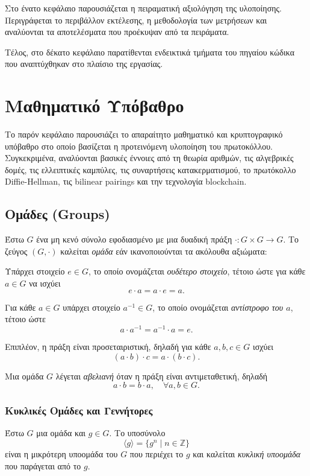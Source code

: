 \documentclass[12pt,a4paper]{report}
\begin{document}
Στο ένατο κεφάλαιο παρουσιάζεται η πειραματική αξιολόγηση της υλοποίησης. Περιγράφεται το περιβάλλον εκτέλεσης, η μεθοδολογία των μετρήσεων και αναλύονται τα αποτελέσματα που προέκυψαν από τα πειράματα.

Τέλος, στο δέκατο κεφάλαιο παρατίθενται ενδεικτικά τμήματα του πηγαίου κώδικα που αναπτύχθηκαν στο πλαίσιο της εργασίας.

\chapter{Μαθηματικό Υπόβαθρο}

Το παρόν κεφάλαιο παρουσιάζει το απαραίτητο μαθηματικό και κρυπτογραφικό υπόβαθρο στο οποίο βασίζεται η προτεινόμενη υλοποίηση του πρωτοκόλλου. Συγκεκριμένα, αναλύονται βασικές έννοιες από τη θεωρία αριθμών, τις αλγεβρικές δομές, τις ελλειπτικές καμπύλες, τις συναρτήσεις κατακερματισμού, το πρωτόκολλο Diffie-Hellman, τις bilinear pairings και την τεχνολογία blockchain.

\section{Ομάδες (Groups)}

Έστω $G$ ένα μη κενό σύνολο εφοδιασμένο με μια δυαδική πράξη $\cdot : G \times G \to G$. 
Το ζεύγος $(G,\cdot)$ καλείται \textit{ομάδα} εάν ικανοποιούνται τα ακόλουθα αξιώματα:

Υπάρχει στοιχείο $e \in G$, το οποίο ονομάζεται \textit{ουδέτερο στοιχείο}, τέτοιο ώστε για κάθε $a \in G$ να ισχύει
\[
e \cdot a = a \cdot e = a.
\]

Για κάθε $a \in G$ υπάρχει στοιχείο $a^{-1} \in G$, το οποίο ονομάζεται \textit{αντίστροφο του $a$}, τέτοιο ώστε
\[
a \cdot a^{-1} = a^{-1} \cdot a = e.
\]

Επιπλέον, η πράξη είναι προσεταιριστική, δηλαδή για κάθε $a,b,c \in G$ ισχύει
\[
(a \cdot b)\cdot c = a \cdot (b \cdot c).
\]

Μια ομάδα $G$ λέγεται \textit{αβελιανή} όταν η πράξη είναι αντιμεταθετική, δηλαδή
\[
a \cdot b = b \cdot a, \quad \forall a,b \in G.
\]

\subsection{Κυκλικές Ομάδες και Γεννήτορες}

Έστω $G$ μια ομάδα και $g \in G$. Το υποσύνολο
\[
\langle g \rangle = \{ g^n \mid n \in \mathbb{Z} \}
\]
είναι η μικρότερη υποομάδα του $G$ που περιέχει το $g$ και καλείται \textit{κυκλική υποομάδα} που παράγεται από το $g$.
\end{document}
